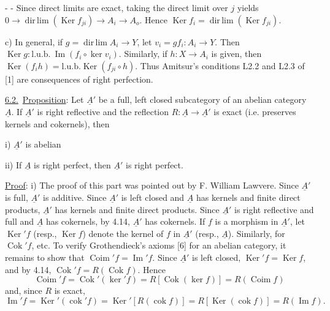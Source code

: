 -  -
Since direct limits are exact, taking the direct limit over $j$ yields $0\longrightarrow\operatorname{dir\,lim}(\operatorname{Ker}f_{ji})\longrightarrow A_i\longrightarrow A_o$.
Hence $\operatorname{Ker}f_i=\operatorname{dir\,lim}(\operatorname{Ker}f_{ji})$.

c) In general, if $g=\operatorname{dir\,lim}A_i\longrightarrow Y$, let $v_i=gf_i:A_i\longrightarrow Y$. Then $\operatorname{Ker}g:\mathrm{l.u.b.}\ \operatorname{Im}(f_i\circ\operatorname{ker}v_i)$.
Similarly, if $h:X\longrightarrow A_i$ is given, then $\operatorname{Ker}(f_i h)=\mathrm{l.u.b.}\operatorname{Ker}(f_{ji}\circ h)$. Thus Amitsur's conditions L2.2 and L2.3 of [1]  are consequences of right perfection.

\uline{6.2.}\ \uline{Proposition}: Let $\underline A'$ be a full, left closed subcategory of an abelian category $\underline A$. If $\underline A'$ is right reflective and the reflection $R:\underline A\longrightarrow\underline A'$ is exact (i.e. preserves kernels and cokernels), then

i) $\underline A'$ is abelian

ii) If $\underline A$ is right perfect, then $\underline A'$ is right perfect.

\uline{Proof}: i) The proof of this part was pointed out by F. William Lawvere. Since $\underline A'$ is full, $\underline A'$ is additive. Since $\underline A'$ is left closed and $\underline A$ has kernels and finite direct products, $\underline A'$ has kernels and finite direct products. Since $\underline A'$ is right reflective and full and $\underline A$ has cokernels, by 4.14, $\underline A'$ has cokernels. If $f$ is a morphism in $\underline A'$, let $\operatorname{Ker}'f$ (resp., $\operatorname{Ker}f$) denote the kernel of $f$ in $\underline A'$ (resp., $\underline A$). Similarly, for $\operatorname{Cok}'f$, etc.
To verify Grothendieck's axioms [6] for an abelian category, it remains to show that $\operatorname{Coim}'f=\operatorname{Im}'f$. Since $\underline A'$ is left closed, $\operatorname{Ker}'f=\operatorname{Ker}f$, and by 4.14, $\operatorname{Cok}'f=R(\operatorname{Cok}f)$. Hence
\[
\operatorname{Coim}'f=\operatorname{Cok}'(\operatorname{ker}'f)
=R[\operatorname{Cok}(\operatorname{ker}f)]=R(\operatorname{Coim}f)
\]
and, since $R$ is exact,
\[
\operatorname{Im}'f=\operatorname{Ker}'(\operatorname{cok}'f)
=\operatorname{Ker}'[R(\operatorname{cok}f)]
=R[\operatorname{Ker}(\operatorname{cok}f)]=R(\operatorname{Im}f).
\]
